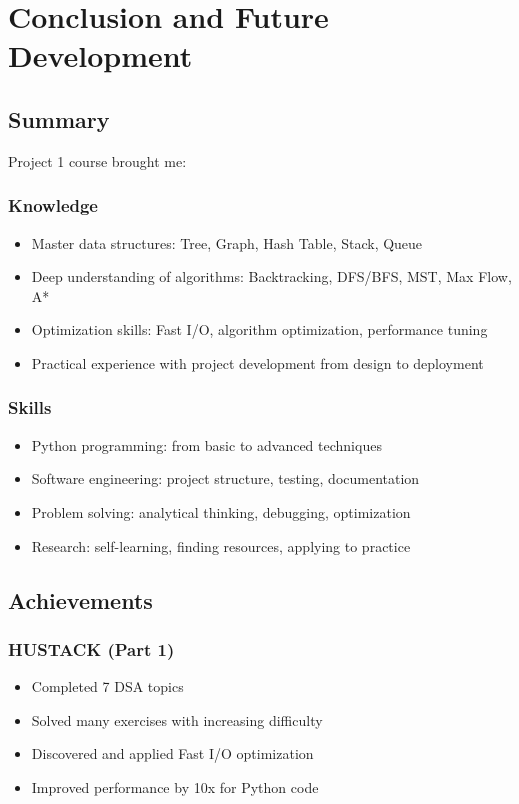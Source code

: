 \documentclass[12pt,a4paper]{article}
\begin{document}
\newpage
\section{Conclusion and Future Development}

\subsection{Summary}
Project 1 course brought me:

\subsubsection{Knowledge}
\begin{itemize}
    \item Master data structures: Tree, Graph, Hash Table, Stack, Queue
    \item Deep understanding of algorithms: Backtracking, DFS/BFS, MST, Max Flow, A*
    \item Optimization skills: Fast I/O, algorithm optimization, performance tuning
    \item Practical experience with project development from design to deployment
\end{itemize}

\subsubsection{Skills}
\begin{itemize}
    \item Python programming: from basic to advanced techniques
    \item Software engineering: project structure, testing, documentation
    \item Problem solving: analytical thinking, debugging, optimization
    \item Research: self-learning, finding resources, applying to practice
\end{itemize}

\subsection{Achievements}

\subsubsection{HUSTACK (Part 1)}
\begin{itemize}
    \item Completed 7 DSA topics
    \item Solved many exercises with increasing difficulty
    \item Discovered and applied Fast I/O optimization
    \item Improved performance by 10x for Python code
\end{itemize}
\end{document}
